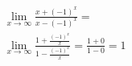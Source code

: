 \begin{ex}
\begin{align}
&\lim_{x\rightarrow \infty} \frac{x+(-1)^x}{x-(-1)^x}=\nonumber\\
&\lim_{x\rightarrow \infty} \frac{1+\frac{(-1)^x}{x}}{1-\frac{(-1)^x}{x}}=\frac{1+0}{1-0}=1\nonumber
\end{align}
\end{ex}